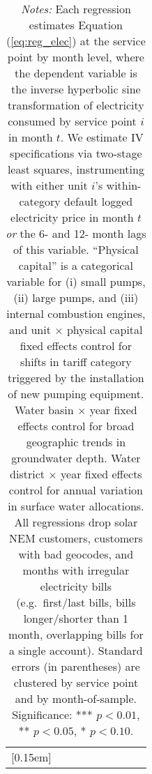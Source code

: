\begin{table}[t!]
\begin{adjustbox}{center}
\begin{tabular}{lcccccccc}
[0.15em]
\hline
\end{tabular}
\end{adjustbox}
\captionsetup{width=\textwidth}
\caption*{\scriptsize \emph{Notes:} Each regression estimates Equation (\ref{eq:reg_elec}) at the service point by month level,
where the dependent variable is the inverse hyperbolic sine transformation of electricity consumed by service point $i$ in month $t$.
We estimate IV specifications via two-stage least squares, instrumenting with either unit $i$'s within-category default 
logged electricity price in month $t$ \emph{or} the 6- and 12- month lags of this variable.
``Physical capital'' is a categorical variable for (i) small pumps, (ii) large pumps, and (iii) internal combustion engines, and unit $\times$
physical capital fixed effects control for shifts in tariff category triggered by the installation of new pumping equipment.
Water basin $\times$ year fixed effects control for broad geographic trends in groundwater depth.
Water district $\times$ year fixed effects control for annual variation in surface water allocations.
All regressions drop solar NEM customers, customers with bad geocodes, and months with irregular electricity bills
(e.g.\ first/last bills, bills longer/shorter than 1 month, overlapping bills for a single account).
Standard errors (in parentheses) are clustered by service point and by month-of-sample.
Significance: *** $p < 0.01$, ** $p < 0.05$, * $p < 0.10$.
}
\end{table}
